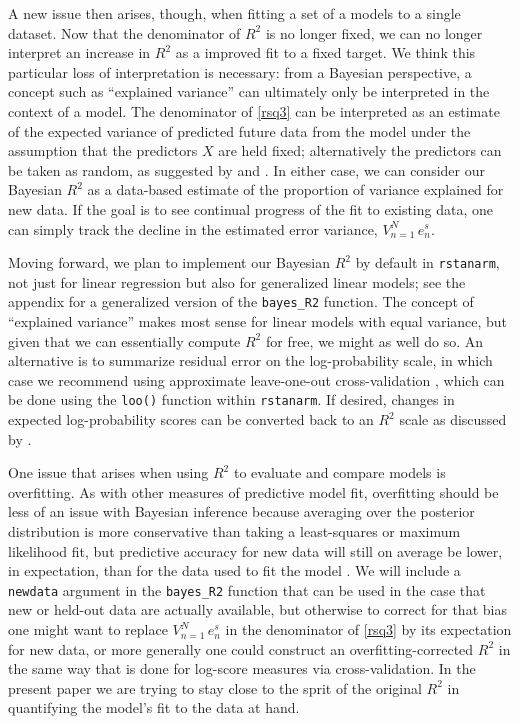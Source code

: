 \documentclass[11pt]{article}
\begin{document}
A new issue then arises, though, when fitting a set of a models to a single
dataset.  Now that the denominator of $R^2$ is no longer fixed, we can no longer
interpret an increase in $R^2$ as a improved fit to a fixed target.  We think
this particular loss of interpretation is necessary:  from a Bayesian
perspective, a concept such as ``explained variance'' can ultimately only be
interpreted in the context of a model.  The denominator of \eqref{rsq3} can be
interpreted as an estimate of the expected variance of predicted future data
from the model under the assumption that the predictors $X$ are held fixed;
alternatively the predictors can be taken as random, as suggested by
\cite{Helland1987} and \cite{Tjur2009}.  In either case, we can consider our
Bayesian $R^2$ as a data-based estimate of the proportion of variance explained
for new data. If the goal is to see continual progress of the fit to existing
data, one can simply track the decline in the estimated error variance,
$V_{n=1}^N \,e_n^s$.

Moving forward, we plan to implement our Bayesian $R^2$ by default in
{\tt rstanarm}, not just for linear regression but also for generalized linear
models; see the appendix for a generalized version of the
\verb#bayes_R2# function. The concept of ``explained variance'' makes most
sense for linear models with equal variance, but given that we can essentially
compute $R^2$ for free, we might as well do so.  An alternative is to summarize
residual error on the log-probability scale, in which case we recommend using
approximate leave-one-out cross-validation \citep{VehtariGelmanGabry2017},
which can be done using the {\tt loo()} function within {\tt rstanarm}.
If desired, changes in expected log-probability scores can be converted back to
an $R^2$ scale as discussed by \cite{Nagelkerke1991}.

One issue that arises when using $R^2$ to evaluate and compare models is
overfitting.  As with other measures of predictive model fit, overfitting should
be less of an issue with Bayesian inference because averaging over the posterior
distribution is more conservative than taking a least-squares or maximum
likelihood fit, but predictive accuracy for new data will still on average be
lower, in expectation, than for the data used to fit the model
\citep{GelmanHwangVehtari2014}. We will include a {\tt newdata} argument in the
\verb#bayes_R2# function  that can be used in the case that new or held-out data
are actually available, but otherwise to correct for that bias one might want to
replace $V_{n=1}^N \,e_n^s$ in the denominator of \eqref{rsq3} by its expectation
for new data, or more generally one could construct an overfitting-corrected
$R^2$ in the same way that is done for log-score measures via cross-validation.
In the present paper we are trying to stay close to the sprit of the original
$R^2$ in quantifying the model's fit to the data at hand.
\end{document}
